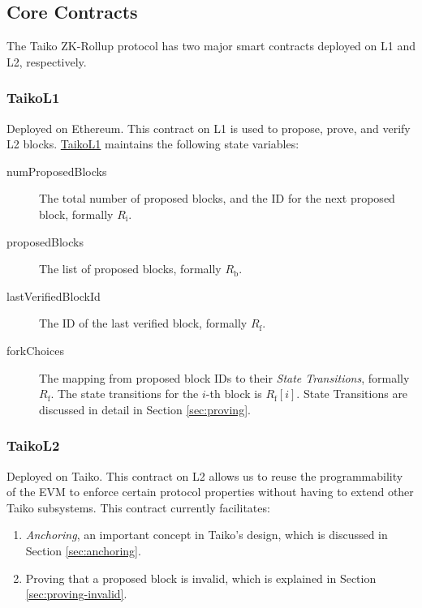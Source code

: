 \subsection{Core Contracts}
The Taiko ZK-Rollup protocol has two major smart contracts deployed on L1 and L2, respectively.

\subsubsection{TaikoL1} Deployed on Ethereum. This contract on L1 is used to propose, prove, and verify L2 blocks. \underline{TaikoL1} maintains the following state variables:

\begin{description}
\item[numProposedBlocks] The total number of proposed blocks, and the ID for the next proposed block, formally $R_\mathrm{i}$.
\item[proposedBlocks] The list of proposed blocks, formally $R_\mathrm{b}$.
\item[lastVerifiedBlockId] The ID of the last verified block, formally $R_\mathrm{f}$.
\item[forkChoices] The mapping from proposed block IDs to their \emph{State Transitions}, formally $R_\mathrm{f}$. The state transitions for the $i$-th block is $R_\mathrm{f}[i]$. State Transitions are discussed in detail in Section \ref{sec:proving}.
\end{description}

\subsubsection{{TaikoL2}} Deployed on Taiko. This contract on L2 allows us to reuse the programmability of the EVM to enforce certain protocol properties without having to extend other Taiko subsystems. This contract currently facilitates:
\begin{enumerate}
\item \emph{Anchoring}, an important concept in Taiko's design, which is discussed in Section \ref{sec:anchoring}.
\item Proving that a proposed block is invalid, which is explained in Section \ref{sec:proving-invalid}.
\end{enumerate}

